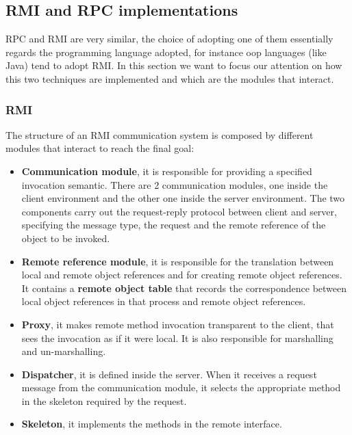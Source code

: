 \documentclass[11pt,a4paper]{article}
\begin{document}
\subsection{RMI and RPC implementations}
RPC and RMI are very similar, the choice of adopting one of them essentially regards the programming language adopted, for instance oop languages (like Java) tend to adopt RMI. In this section we want to focus our attention on how this two techniques are implemented and which are the modules that interact.
\subsubsection{RMI}
The structure of an RMI communication system is composed by different modules that interact to reach the final goal:
\begin{itemize}
	\item \textbf{Communication module}, it is responsible for providing a specified invocation semantic. There are 2 communication modules, one inside the client environment and the other one inside the server environment. The two components carry out the request-reply protocol between client and server, specifying the message type, the request and the remote reference of the object to be invoked. 
	\item \textbf{Remote reference module}, it is responsible for the translation between local and remote object references and for creating remote object references. It contains a \textbf{remote object table} that records the correspondence between local object references in that process and remote object references.
	\item \textbf{Proxy}, it makes remote method invocation transparent to the client, that sees the invocation as if it were local. It is also responsible for marshalling and un-marshalling.
	\item \textbf{Dispatcher}, it is defined inside the server. When it receives a request message from the communication module, it selects the appropriate method in the skeleton required by the request.
	\item \textbf{Skeleton}, it implements the methods in the remote interface.
\end{itemize}
\end{document}
